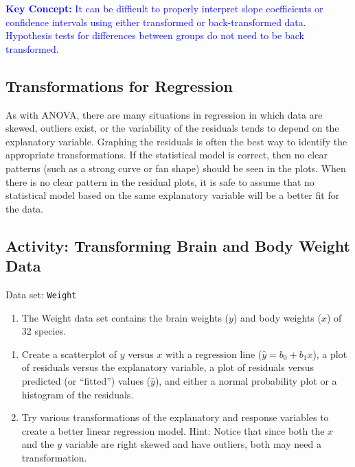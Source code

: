 \documentclass[
]{book}
\providecommand{\tightlist}{%
  \setlength{\itemsep}{0pt}\setlength{\parskip}{0pt}}
\begin{document}
\textbf{\textcolor{blue}{Key Concept:}} \textcolor{blue}{It can be difficult to properly interpret slope coefficients or confidence intervals using either transformed or back-transformed data. Hypothesis tests for differences between groups do not need to be back transformed.}

\hypertarget{transformations-for-regression}{%
\subsection*{Transformations for Regression}\label{transformations-for-regression}}

As with ANOVA, there are many situations in regression in which data are skewed, outliers exist, or the variability of the residuals tends to depend on the explanatory variable. Graphing the residuals is often the best way to identify the appropriate transformations. If the statistical model is correct, then no clear patterns (such as a strong curve or fan shape) should be seen in the plots. When there is no clear pattern in the residual plots, it is safe to assume that no statistical model based on the same explanatory variable will be a better fit for the data.

\hypertarget{activity-transforming-brain-and-body-weight-data}{%
\subsection*{Activity: Transforming Brain and Body Weight Data}\label{activity-transforming-brain-and-body-weight-data}}

Data set: \texttt{Weight}

\begin{enumerate}
\def\labelenumi{\arabic{enumi}.}
\setcounter{enumi}{31}
\tightlist
\item
  The Weight data set contains the brain weights (\(y\)) and body weights (\(x\)) of 32 species.
\end{enumerate}

\begin{enumerate}
\def\labelenumi{\alph{enumi}.}
\item
  Create a scatterplot of \(y\) versus \(x\) with a regression line (\(\hat{y} = b_0 + b_1x\)), a plot of residuals versus the explanatory variable, a plot of residuals versus predicted (or ``fitted'') values (\(\hat{y}\)), and either a normal probability plot or a histogram of the residuals.
\item
  Try various transformations of the explanatory and response variables to create a better linear regression model. Hint: Notice that since both the \(x\) and the \(y\) variable are right skewed and have outliers, both may need a transformation.
\end{enumerate}
\end{document}
